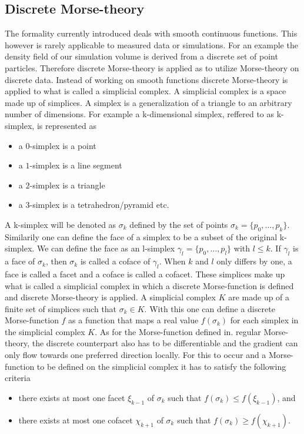 \subsection{Discrete Morse-theory}
The formality currently introduced deals with smooth continuous functions. This
however is rarely applicable to measured data or simulations. For an example the density field
of our simulation volume is derived from a discrete set of
point particles. Therefore discrete
Morse-theory\cite{FORMAN199890} is applied as to utilize Morse-theory on
discrete data. Instead of working on smooth functions discrete Morse-theory is
applied to what is called a simplicial complex. A simplicial complex is a space made up
of simplices. A simplex is a generalization of
a triangle to an arbitrary number of dimensions. For example a k-dimensional
simplex, reffered to as k-simplex, is represented as
\begin{itemize}
    \item a $0$-simplex is a point
    \item a $1$-simplex is a line segment
    \item a $2$-simplex is a triangle
    \item a $3$-simplex is a tetrahedron/pyramid etc.
\end{itemize}
A k-simplex will be denoted as $\sigma_k$ defined by the set of points
$\sigma_k=\{p_0, \dots,p_k\}$. Similarily one can define the face of a simplex
to be a subset of the original k-simplex. We can define the face as an
l-simplex $\gamma_l=\{p_0,\dots,p_l\}$ with $l\leq k$. If $\gamma_l$ is a face
of $\sigma_k$, then $\sigma_k$ is called a coface of $\gamma_l$. When $k$ and
$l$ only differs by one, a face is called a facet and a coface is called a cofacet. These simplices make up
what is called a simplicial complex in which a discrete Morse-function is
defined and discrete Morse-theory is applied. A simplicial complex $K$ are made
up of a finite set of simplices such that $\sigma_k\in K$. With this one can
define a discrete Morse-function $f$ as a function that maps a real value
$f(\sigma_k)$ for each simplex in the simplicial complex $K$. As for the
Morse-function defined in. regular Morse-theory, the discrete counterpart also has
to be differentiable and the gradient can only flow towards one preferred direction
locally. For this to occur and a Morse-function to be defined on the simplicial
complex it has to satisfy the following criteria
\begin{itemize}
    \item there exists at most one facet $\xi_{k-1}$ of $\sigma_{k}$ such
    that $f(\sigma_k)\leq f(\xi_{k-1})$, and
    \item there exists at most one cofacet $\chi_{k+1}$ of $\sigma_{k}$ such
    that $f(\sigma_k)\geq f(\chi_{k+1})$.
\end{itemize}
